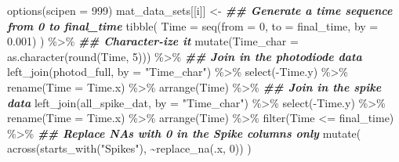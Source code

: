 \documentclass[
]{book}
\newenvironment{Shaded}{\begin{snugshade}}{\end{snugshade}}
\newcommand{\AttributeTok}[1]{\textcolor[rgb]{0.77,0.63,0.00}{#1}}
\newcommand{\DecValTok}[1]{\textcolor[rgb]{0.00,0.00,0.81}{#1}}
\newcommand{\DocumentationTok}[1]{\textcolor[rgb]{0.56,0.35,0.01}{\textbf{\textit{#1}}}}
\newcommand{\FloatTok}[1]{\textcolor[rgb]{0.00,0.00,0.81}{#1}}
\newcommand{\FunctionTok}[1]{\textcolor[rgb]{0.00,0.00,0.00}{#1}}
\newcommand{\NormalTok}[1]{#1}
\newcommand{\OtherTok}[1]{\textcolor[rgb]{0.56,0.35,0.01}{#1}}
\newcommand{\SpecialCharTok}[1]{\textcolor[rgb]{0.00,0.00,0.00}{#1}}
\newcommand{\StringTok}[1]{\textcolor[rgb]{0.31,0.60,0.02}{#1}}
\begin{document}
\begin{Shaded}
\begin{Highlighting}[]
  \FunctionTok{options}\NormalTok{(}\AttributeTok{scipen =} \DecValTok{999}\NormalTok{)}
\NormalTok{  mat\_data\_sets[[i]] }\OtherTok{\textless{}{-}}
    \DocumentationTok{\#\# Generate a time sequence from 0 to final\_time}
    \FunctionTok{tibble}\NormalTok{(}
      \AttributeTok{Time =} \FunctionTok{seq}\NormalTok{(}\AttributeTok{from =} \DecValTok{0}\NormalTok{, }\AttributeTok{to =}\NormalTok{ final\_time, }\AttributeTok{by =} \FloatTok{0.001}\NormalTok{)}
\NormalTok{    ) }\SpecialCharTok{\%\textgreater{}\%}
    \DocumentationTok{\#\# Character{-}ize it}
    \FunctionTok{mutate}\NormalTok{(}\AttributeTok{Time\_char =} \FunctionTok{as.character}\NormalTok{(}\FunctionTok{round}\NormalTok{(Time, }\DecValTok{5}\NormalTok{))) }\SpecialCharTok{\%\textgreater{}\%}
    \DocumentationTok{\#\# Join in the photodiode data}
    \FunctionTok{left\_join}\NormalTok{(photod\_full, }\AttributeTok{by =} \StringTok{"Time\_char"}\NormalTok{) }\SpecialCharTok{\%\textgreater{}\%}
    \FunctionTok{select}\NormalTok{(}\SpecialCharTok{{-}}\NormalTok{Time.y) }\SpecialCharTok{\%\textgreater{}\%}
    \FunctionTok{rename}\NormalTok{(}\AttributeTok{Time =}\NormalTok{ Time.x) }\SpecialCharTok{\%\textgreater{}\%}
    \FunctionTok{arrange}\NormalTok{(Time) }\SpecialCharTok{\%\textgreater{}\%}
    \DocumentationTok{\#\# Join in the spike data}
    \FunctionTok{left\_join}\NormalTok{(all\_spike\_dat, }\AttributeTok{by =} \StringTok{"Time\_char"}\NormalTok{) }\SpecialCharTok{\%\textgreater{}\%}
    \FunctionTok{select}\NormalTok{(}\SpecialCharTok{{-}}\NormalTok{Time.y) }\SpecialCharTok{\%\textgreater{}\%}
    \FunctionTok{rename}\NormalTok{(}\AttributeTok{Time =}\NormalTok{ Time.x) }\SpecialCharTok{\%\textgreater{}\%}
    \FunctionTok{arrange}\NormalTok{(Time) }\SpecialCharTok{\%\textgreater{}\%}
    \FunctionTok{filter}\NormalTok{(Time }\SpecialCharTok{\textless{}=}\NormalTok{ final\_time) }\SpecialCharTok{\%\textgreater{}\%}
    \DocumentationTok{\#\# Replace NAs with 0 in the Spike columns only}
    \FunctionTok{mutate}\NormalTok{(}
      \FunctionTok{across}\NormalTok{(}\FunctionTok{starts\_with}\NormalTok{(}\StringTok{"Spikes"}\NormalTok{), }\SpecialCharTok{\textasciitilde{}}\FunctionTok{replace\_na}\NormalTok{(.x, }\DecValTok{0}\NormalTok{))}
\NormalTok{    )}


\end{Highlighting}
\end{Shaded}
\end{document}

